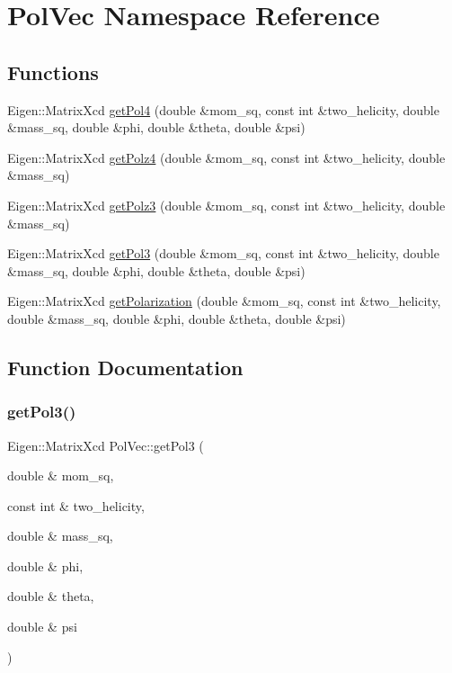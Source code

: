 \hypertarget{namespacePolVec}{}\section{Pol\+Vec Namespace Reference}
\label{namespacePolVec}
\subsection*{Functions}
\begin{DoxyCompactItemize}
\item 
Eigen\+::\+Matrix\+Xcd \mbox{\hyperlink{namespacePolVec_a893f95fc9856b40243deeba6939e5318}{get\+Pol4}} (double \&mom\+\_\+sq, const int \&two\+\_\+helicity, double \&mass\+\_\+sq, double \&phi, double \&theta, double \&psi)
\item 
Eigen\+::\+Matrix\+Xcd \mbox{\hyperlink{namespacePolVec_a51d6ba884df8fd4c9466477aae902ec7}{get\+Polz4}} (double \&mom\+\_\+sq, const int \&two\+\_\+helicity, double \&mass\+\_\+sq)
\item 
Eigen\+::\+Matrix\+Xcd \mbox{\hyperlink{namespacePolVec_a8671b890f81a976ae4f806cf53ae61df}{get\+Polz3}} (double \&mom\+\_\+sq, const int \&two\+\_\+helicity, double \&mass\+\_\+sq)
\item 
Eigen\+::\+Matrix\+Xcd \mbox{\hyperlink{namespacePolVec_ade3c809bd4af71b85d16a9363ac33ee6}{get\+Pol3}} (double \&mom\+\_\+sq, const int \&two\+\_\+helicity, double \&mass\+\_\+sq, double \&phi, double \&theta, double \&psi)
\item 
Eigen\+::\+Matrix\+Xcd \mbox{\hyperlink{namespacePolVec_a068ffc885b3c06caa2c662b8887c0891}{get\+Polarization}} (double \&mom\+\_\+sq, const int \&two\+\_\+helicity, double \&mass\+\_\+sq, double \&phi, double \&theta, double \&psi)
\end{DoxyCompactItemize}


\subsection{Function Documentation}
\mbox{\label{namespacePolVec_ade3c809bd4af71b85d16a9363ac33ee6}} 
\subsubsection{\texorpdfstring{getPol3()}{getPol3()}}
{\footnotesize\ttfamily Eigen\+::\+Matrix\+Xcd Pol\+Vec\+::get\+Pol3 (\begin{DoxyParamCaption}\item[{double \&}]{mom\+\_\+sq,  }\item[{const int \&}]{two\+\_\+helicity,  }\item[{double \&}]{mass\+\_\+sq,  }\item[{double \&}]{phi,  }\item[{double \&}]{theta,  }\item[{double \&}]{psi }\end{DoxyParamCaption})}

